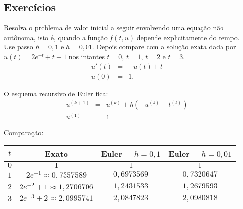 \subsection*{Exercícios}



\begin{exer} Resolva o problema de valor inicial a seguir envolvendo uma equação não autônoma, isto é, quando a função $f(t,u)$ depende explicitamente do tempo. Use passo $h=0,1$ e $h=0,01$. Depois compare com a solução exata dada por $u(t)=2e^{-t}+t-1$ nos intantes $t=0$, $t=1$, $t=2$ e $t=3$.
  \begin{eqnarray*}
    u'(t)&=&-u(t)+t\\
    u(0)&=&1,
  \end{eqnarray*}
\end{exer}

\begin{resp}
O esquema recursivo de Euler fica:
\begin{eqnarray*}
  u^{(k+1)}&=&u^{(k)}+h(-u^{(k)}+t^{(k)})\\
  u^{(1)}&=&1
\end{eqnarray*}

Comparação:
\begin{center}
\begin{tabular}{|c|c|c|c|}\hline
$t$ &  Exato & Euler~~ $h=0,1$ & Euler~~ $h=0,01$\\\hline
$0$ &  $1$ & $1$ & $1$\\\hline
$1$ &   $2e^{-1}\approx 0,7357589$ & $0,6973569$   &   $0,7320647$  \\\hline
$2$ &   $2e^{-2}+1\approx  1,2706706$ & $ 1,2431533 $   &  $ 1,2679593$     \\\hline
$3$ &   $2e^{-3}+2\approx 2,0995741$  & $ 2,0847823$ & $2,0980818$   \\\hline
\end{tabular}
\end{center}
\end{resp}

